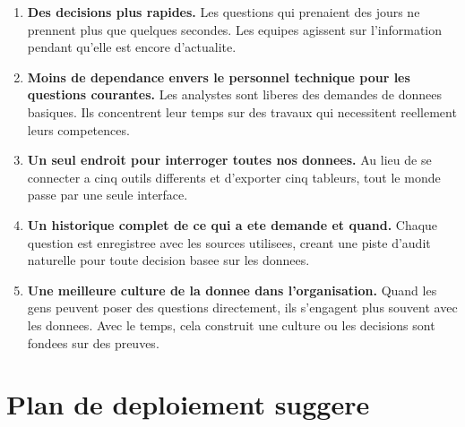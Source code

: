 \documentclass[12pt, a4paper]{article}
\begin{document}
\begin{enumerate}[leftmargin=1.6em, itemsep=8pt]
  \item \textbf{Des decisions plus rapides.}
  Les questions qui prenaient des jours ne prennent plus que quelques secondes.
  Les equipes agissent sur l'information pendant qu'elle est encore d'actualite.

  \item \textbf{Moins de dependance envers le personnel technique pour les questions courantes.}
  Les analystes sont liberes des demandes de donnees basiques.
  Ils concentrent leur temps sur des travaux qui necessitent reellement leurs competences.

  \item \textbf{Un seul endroit pour interroger toutes nos donnees.}
  Au lieu de se connecter a cinq outils differents et d'exporter cinq tableurs,
  tout le monde passe par une seule interface.

  \item \textbf{Un historique complet de ce qui a ete demande et quand.}
  Chaque question est enregistree avec les sources utilisees, creant une piste
  d'audit naturelle pour toute decision basee sur les donnees.

  \item \textbf{Une meilleure culture de la donnee dans l'organisation.}
  Quand les gens peuvent poser des questions directement, ils s'engagent plus
  souvent avec les donnees. Avec le temps, cela construit une culture ou les
  decisions sont fondees sur des preuves.
\end{enumerate}


\section{Plan de deploiement suggere}
\end{document}
